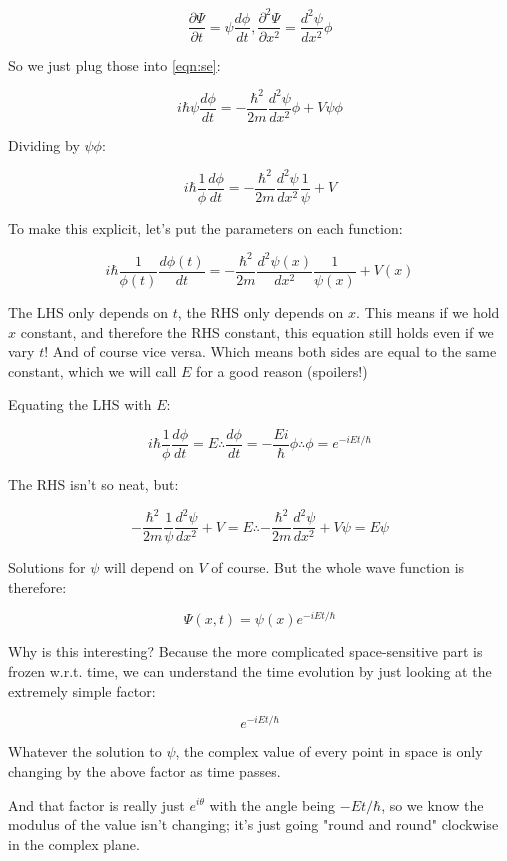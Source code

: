 $$
\frac{\partial \Psi}{\partial t}
= \psi \frac{d \phi}{d t},
\frac{\partial^2 \Psi}{\partial x^2}
= \frac{d^2 \psi}{d x^2}  \phi
$$

So we just plug those into \eqref{eqn:se}:

$$
i\hbar
\psi \frac{d \phi}{d t}
=
- \frac{\hbar^2}{2m}
\frac{d^2 \psi}{d x^2}  \phi
+ V \psi \phi
$$

Dividing by $\psi \phi$:

$$
i\hbar
\frac{1}{\phi}
\frac{d \phi}{d t}
=
- \frac{\hbar^2}{2m}
\frac{d^2 \psi}{d x^2}
\frac{1}{\psi}
+ V
$$

To make this explicit, let's put the parameters on each function:

$$
i\hbar
\frac{1}{\phi(t)}
\frac{d \phi(t)}{d t}
=
- \frac{\hbar^2}{2m}
\frac{d^2 \psi(x)}{d x^2}
\frac{1}{\psi(x)}
+ V(x)
$$

The LHS only depends on $t$, the RHS only depends on $x$. This means if we hold $x$ constant, and therefore the RHS constant, this equation still holds even if we vary $t$! And of course vice versa. Which means both sides are equal to the same constant, which we will call $E$ for a good reason (spoilers!)

Equating the LHS with $E$:

$$
i\hbar
\frac{1}{\phi}
\frac{d \phi}{d t}
= E
\therefore
\frac{d \phi}{d t}
=
- \frac{Ei}{\hbar}
\phi
\therefore
\phi = e^{-iEt/\hbar}
$$

The RHS isn't so neat, but:

$$
- \frac{\hbar^2}{2m}
\frac{1}{\psi}
\frac{d^2 \psi}{d x^2}
+ V
=
E
\therefore
- \frac{\hbar^2}{2m}
\frac{d^2 \psi}{d x^2}
+ V\psi
=
E\psi
$$

Solutions for $\psi$ will depend on $V$ of course. But the whole wave function is therefore:

$$\Psi(x, t) = \psi(x) e^{-iEt/\hbar}$$

Why is this interesting? Because the more complicated space-sensitive part is frozen w.r.t. time, we can understand the time evolution by just looking at the extremely simple factor:

$$
e^{-iEt/\hbar}
$$

Whatever the solution to $\psi$, the complex value of every point in space is only changing by the above factor as time passes.

And that factor is really just $e^{i\theta}$ with the angle being $-Et/\hbar$, so we know the modulus of the value isn't changing; it's just going "round and round" clockwise in the complex plane.

